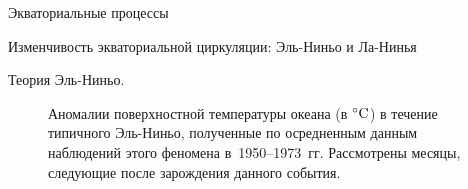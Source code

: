 \begin{chapter}{Экваториальные процессы}
\begin{section}{Изменчивость экваториальной циркуляции: Эль-Ниньо и Ла-Нинья}
\begin{paragraph}{Теория Эль-Ниньо.}
\begin{figure}[p!]
\caption{Аномалии
поверхностной температуры океана (в ${}^\circ\mbox{C}$) в течение типичного
Эль-Ниньо, полученные по осредненным данным наблюдений этого феномена 
в~1950--1973~гг. Рассмотрены месяцы, следующие после зарождения данного 
события.~\cite{Rasmusson:1982}}
\label{fig:elninoanomalies}
\end{figure}
%


\end{paragraph}
\end{section}
\end{chapter}
